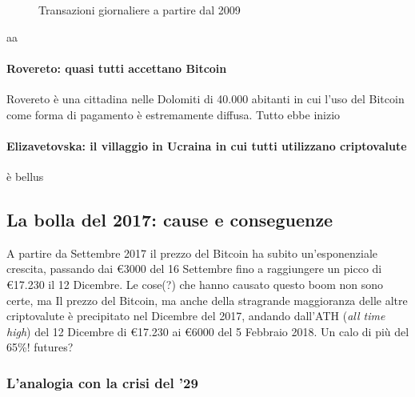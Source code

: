 \documentclass {article}
\begin{document}
{\vspace {0.5cm}
\begin{figure}
\caption {Transazioni giornaliere a partire dal 2009}
\end{figure}
\vspace {0.2cm}
\noindent
%
aa


\paragraph {Rovereto: quasi tutti accettano Bitcoin}


Rovereto è una cittadina nelle Dolomiti di 40.000 abitanti in cui l'uso del Bitcoin come forma di pagamento è estremamente diffusa.
Tutto ebbe inizio


\paragraph {Elizavetovska: il villaggio in Ucraina in cui tutti utilizzano criptovalute}


è bellus


\subsection {La bolla del 2017: cause e conseguenze}


A partire da Settembre 2017 il prezzo del Bitcoin ha subito un'esponenziale crescita, passando dai \euro{3000} del 16 Settembre fino a raggiungere un picco di \euro{17.230} il 12 Dicembre.
Le cose(?) che hanno causato questo boom non sono certe, ma
Il prezzo del Bitcoin, ma anche della stragrande maggioranza delle altre criptovalute è precipitato nel Dicembre del 2017, andando dall'ATH (\textit{all time high}) del 12 Dicembre di \euro{17.230} ai \euro{6000} del 5 Febbraio 2018. Un calo di più del 65\%!
futures?


\subsubsection {L'analogia con la crisi del '29}


}
\end{document}
